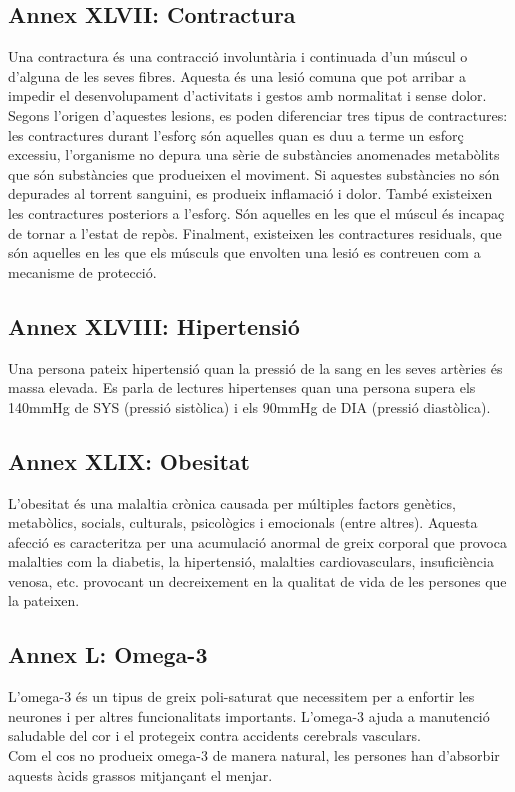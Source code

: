 \documentclass[a4paper,12pt]{article}
\begin{document}
\subsection*{Annex XLVII: Contractura}
Una contractura és una contracció involuntària i continuada d'un múscul o d'alguna de les seves fibres. Aquesta és una lesió comuna que pot arribar a impedir el desenvolupament d'activitats i gestos amb normalitat i sense dolor.\\
Segons l'origen d'aquestes lesions, es poden diferenciar tres tipus de contractures: les contractures durant l'esforç són aquelles quan es duu a terme un esforç excessiu, l'organisme no depura una sèrie de substàncies anomenades metabòlits que són substàncies que produeixen el moviment. Si aquestes substàncies no són depurades al torrent sanguini, es produeix inflamació i dolor. També existeixen les contractures posteriors a l'esforç. Són aquelles en les que el múscul és incapaç de tornar a l'estat de repòs. Finalment, existeixen les contractures residuals, que són aquelles en les que els músculs que envolten una lesió es contreuen com a mecanisme de protecció.
\subsection*{Annex XLVIII: Hipertensió}
Una persona pateix hipertensió quan la pressió de la sang en les seves artèries és massa elevada. Es parla de lectures hipertenses quan una persona supera els 140mmHg de SYS (pressió sistòlica) i els 90mmHg de DIA (pressió diastòlica).
\subsection*{Annex XLIX: Obesitat}
L'obesitat és una malaltia crònica causada per múltiples factors genètics, metabòlics, socials, culturals, psicològics i emocionals (entre altres). Aquesta afecció es caracteritza per una acumulació anormal de greix corporal que provoca malalties com la diabetis, la hipertensió, malalties cardiovasculars, insuficiència venosa, etc. provocant un decreixement en la qualitat de vida de les persones que la pateixen.
\subsection*{Annex L: Omega-3}
L'omega-3 és un tipus de greix poli-saturat que necessitem per a enfortir les neurones i per altres funcionalitats importants. L'omega-3 ajuda a manutenció saludable del cor i el protegeix contra accidents cerebrals vasculars.\\
Com el cos no produeix omega-3 de manera natural, les persones han d'absorbir aquests àcids grassos mitjançant el menjar.
\end{document}

